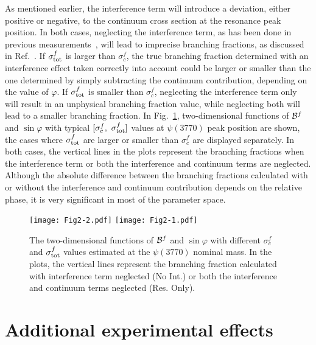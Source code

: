 \documentclass[%
preprint,
 amsmath,amssymb,
 aps,
]{revtex4-2}
\newcommand{\br}{{\cal B}}
\newcommand{\psipp}{\psi(3770)}
\begin{document}
As mentioned earlier, the interference term will introduce a deviation, either positive 
or negative, to the continuum cross section at the resonance peak position.
In both cases, neglecting the interference term, as has been done in previous 
measurements~\cite{BESIII:2013ujm,BES:2007zan,CLEO:2005tkm,CLEO:2005zrs,Belle:2013hkg,Belle:2009rfa},
will lead to imprecise branching fractions, as discussed in Ref.~\cite{Wang:2005sk}. 
If $\sigma_{\rm tot}^f$ is larger than $\sigma_c^f$, the true branching fraction 
determined with an interference effect taken correctly into account
could be larger or smaller than the one determined by simply subtracting the continuum contribution, 
depending on the value of $\varphi$. If $\sigma_{\rm tot}^f$ 
is smaller than $\sigma_c^f$, neglecting the interference term only will result 
in an unphysical branching fraction value, while neglecting both will lead to a smaller 
branching fraction. In Fig.~\ref{fig:br-vs-phi-psi3770}, 
two-dimensional functions of $\br^f$ and $\sin\varphi$ with typical 
$[\sigma_{c}^f,~\sigma_{\rm tot}^f]$ values at $\psipp$ peak position
are shown, the cases where $\sigma_{\rm tot}^{f}$ are larger or smaller
than $\sigma_{c}^{f}$ are displayed separately. In both cases, the vertical lines in the plots
represent the branching fractions when the
interference term or both the interference and continuum terms are neglected.
Although the absolute difference between the branching fractions calculated with 
or without the interference and continuum contribution depends on the relative phase,
it is very significant in most of the parameter space. 

\begin{figure}[htbp]
    \centering
    \texttt{[image: Fig2-2.pdf]}
    \texttt{[image: Fig2-1.pdf]}
    \caption{The two-dimensional functions of $\br^f$ and $\sin\varphi$ with 
    different $\sigma_{c}^f$ and $\sigma_{\rm tot}^f$ values estimated at the 
    $\psipp$ nominal mass. In the plots, the vertical lines represent
    the branching fraction calculated with interference term neglected (No Int.)
    or both the interference and continuum terms neglected (Res. Only).}
    \label{fig:br-vs-phi-psi3770}
\end{figure}

\section{Additional experimental effects}\label{ch:discussion}
\end{document}

